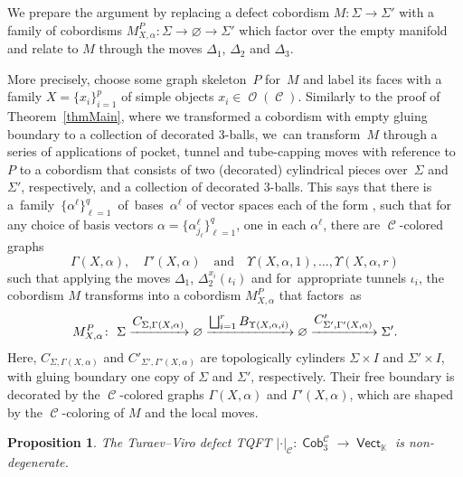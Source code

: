 \documentclass[10pt,a4paper]{amsart}
\DeclareMathOperator{\Hom}{Hom}
\DeclareMathOperator{\vect}{\mathsf{Vect}}
\DeclareMathOperator{\K}{\mathbb{K}}
\DeclareMathOperator{\Cob}{\mathsf{Cob}}
\DeclareMathOperator{\calc}{\mathcal{C}}
\DeclareMathOperator{\calo}{\mathcal{O}}
\numberwithin{equation}{section}
\newtheorem{Proposition}[Proposition]{Proposition}
\theoremstyle{definition}
\begin{document}
We prepare the argument by replacing a defect cobordism $M\colon \Sigma \rightarrow \Sigma'$ with a family of cobordisms $M^P_{X, \alpha}\colon \Sigma \rightarrow \varnothing \rightarrow \Sigma'$ which factor over the empty manifold and relate to $M$ through the moves $\Delta_1$, $\Delta_2$ and $\Delta_3$.

More precisely, choose some graph skeleton~$P$ for~$M$ and label its faces with a family ${X = \{x_i\}_{i = 1}^p}$ of simple objects $x_i \in \calo(\calc)$. Similarly to the proof of Theorem~\ref{thmMain}, where we transformed a cobordism with empty gluing boundary to a collection of decorated 3-balls, we~can transform~$M$ through a series of applications of pocket, tunnel and tube-capping moves with reference to~$P$ to a cobordism that consists of two (decorated) cylindrical pieces over~$\Sigma$ and~$\Sigma'$, respectively, and a collection of decorated 3-balls. This says that there is a~family~$\{\alpha^{\ell}\}_{\ell = 1}^q$~of~bases~$\alpha^{\ell}$ of vector spaces each of the form \smash{$\Hom_{\calc}\bigl(x_{j_1}^{\varepsilon(1)} \otimes \dots \otimes x_{j_{\ell}}^{\varepsilon(\ell)}, \mathbbm{1}\bigr)$}, such that for any choice of basis vectors $\alpha = \{\alpha_{j_{\ell}}^{\ell}\}_{\ell = 1}^q$, one in each $\alpha^{\ell}$, there are $\calc$-colored graphs
\[
\Gamma(X, \alpha) , \quad \Gamma'(X, \alpha) \quad \text{and} \quad \Upsilon(X, \alpha, 1), \dots, \Upsilon(X, \alpha, r)
\]
 such that applying the moves $\Delta_1$, $\Delta_2^{x_i}(\iota_i)$ and  for~appro\-priate tunnels $\iota_i$, the cobordism $M$ transforms into a cobordism $M_{X, \alpha}^P$ that factors~as
\begin{align} \label{eqNDFact}
 M_{X, \alpha}^P\colon \ \Sigma \xrightarrow{\mbox{\normalsize$C_{\Sigma, \Gamma(X, \alpha)}$}} \varnothing \xrightarrow{\mbox{\normalsize$\bigsqcup_{i = 1}^rB_{\Upsilon(X, \alpha, i)}$}} \varnothing \xrightarrow{\mbox{\normalsize$C'_{\Sigma', \Gamma'(X, \alpha)}$}} \Sigma'.
\end{align}
Here, $C_{\Sigma, \Gamma(X, \alpha)}$ and $C'_{\Sigma', \Gamma'(X, \alpha)}$ are topologically cylinders $\Sigma \times I$ and $\Sigma' \times I$, with gluing boundary one copy of $\Sigma$ and $\Sigma'$, respectively. Their free boundary is decorated by the $\calc$-colored graphs $\Gamma(X, \alpha)$ and $ \Gamma'(X, \alpha)$, which are shaped by the $\calc$-coloring of $M$ and the local moves.
\begin{Proposition}
 \label{propND}
 The Turaev--Viro defect TQFT $|\cdot|_{\calc}\colon \Cob_3^{\calc} \rightarrow \vect_{\K}$ is non-degenerate.
\end{Proposition}
\end{document}
